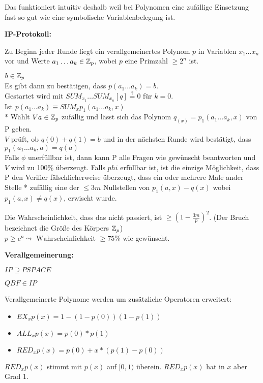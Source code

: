 Das funktioniert intuitiv deshalb weil bei Polynomen eine zufällige Einsetzung
fast so gut wie eine symbolische Variablenbelegung ist.












\textbf{IP-Protokoll:}

Zu Beginn jeder Runde liegt ein verallgemeinertes Polynom $p$ in Variablen $x_1
\dots x_n$ vor und Werte $a_1 \dots a_k \in \mathbb{Z}_p$, wobei $p$ eine Primzahl $\geq
2^n$ ist.

$b \in \mathbb{Z}_p$
\\
Es gibt dann zu bestätigen, dass $p(a_1 \dots a_k) = b$.
\\
Gestartet wird mit
$SUM_{x_1} \dots SUM_{x_n}[q] \stackrel{?}{=} 0$ für $k = 0$.
\\
Ist $p(a_1 \dots a_k) \equiv SUM_x p_1(a_1 \dots a_k, x)$
\\
* Wählt $V a \in \mathbb{Z}_p$ zufällig und lässt sich das Polynom
$q_(x) = p_1(a_1 \dots a_k, x)$
von P geben.
\\
$V$ prüft, ob $q(0) + q(1) = b$ und in der nächsten Runde wird bestätigt, dass
$p_1(a_1 \dots a_k, a) = q(a)$
\\
Falls $\phi$ unerfüllbar ist, dann kann P alle Fragen wie gewünscht beantworten und
$V$ wird zu 100\% überzeugt.
Falls $phi$ erfüllbar ist, ist die einzige Möglichkeit, dass P den Verifier
fälschlicherweise überzeugt, dass ein oder mehrere Male ander Stelle * zufällig
eine der $\leq 3m$ Nullstellen von $p_1(a, x) - q(x)$ wobei $p_1(a, x) \neq
q(x)$, erwischt wurde.

Die Wahrscheinlichkeit, dass das nicht passiert, ist $\geq (1 -
\frac{3m}{p})^2$. (Der Bruch bezeichnet die Größe des Körpers $\mathbb{Z}_p$)
\\
$p \geq c^n \leadsto \text{ Wahrscheinlichkeit } \geq 75\%$ wie gewünscht.






\textbf{Verallgemeinerung:}


$\mathit{IP} \supseteq \mathit{PSPACE}$

$\mathit{QBF} \in \mathit{IP}$

Verallgemeinerte Polynome werden um zusätzliche Operatoren erweitert:
\begin{itemize}
    \item $\mathit{EX}_x p(x) = 1 - (1 - p(0))(1 - p(1))$
    \item $\mathit{ALL}_x p(x) = p(0) * p(1)$
    \item $\mathit{RED}_x p(x) = p(0) + x * (p(1) - p(0))$
\end{itemize}
$\mathit{RED}_x p(x)$ stimmt mit $p(x)$ auf $[0,1)$ überein.
$\mathit{RED}_x p(x)$ hat in $x$ aber Grad 1.

